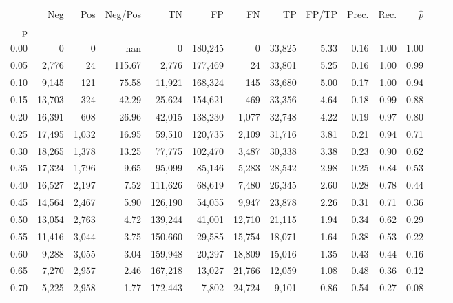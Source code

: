 \begin{tabular}{rrrrrrrrrrrrrr}
\toprule
{} &     Neg &    Pos & Neg/Pos &       TN &       FP &      FN &      TP & FP/TP & Prec. &  Rec. & $\hat{p}$ \\
p    &         &        &         &          &          &         &         &       &       &       &           \\
\midrule
0.00 &       0 &      0 &     nan &        0 &  180,245 &       0 &  33,825 &  5.33 &  0.16 &  1.00 &      1.00 \\
0.05 &   2,776 &     24 &  115.67 &    2,776 &  177,469 &      24 &  33,801 &  5.25 &  0.16 &  1.00 &      0.99 \\
0.10 &   9,145 &    121 &   75.58 &   11,921 &  168,324 &     145 &  33,680 &  5.00 &  0.17 &  1.00 &      0.94 \\
0.15 &  13,703 &    324 &   42.29 &   25,624 &  154,621 &     469 &  33,356 &  4.64 &  0.18 &  0.99 &      0.88 \\
0.20 &  16,391 &    608 &   26.96 &   42,015 &  138,230 &   1,077 &  32,748 &  4.22 &  0.19 &  0.97 &      0.80 \\
0.25 &  17,495 &  1,032 &   16.95 &   59,510 &  120,735 &   2,109 &  31,716 &  3.81 &  0.21 &  0.94 &      0.71 \\
0.30 &  18,265 &  1,378 &   13.25 &   77,775 &  102,470 &   3,487 &  30,338 &  3.38 &  0.23 &  0.90 &      0.62 \\
0.35 &  17,324 &  1,796 &    9.65 &   95,099 &   85,146 &   5,283 &  28,542 &  2.98 &  0.25 &  0.84 &      0.53 \\
0.40 &  16,527 &  2,197 &    7.52 &  111,626 &   68,619 &   7,480 &  26,345 &  2.60 &  0.28 &  0.78 &      0.44 \\
0.45 &  14,564 &  2,467 &    5.90 &  126,190 &   54,055 &   9,947 &  23,878 &  2.26 &  0.31 &  0.71 &      0.36 \\
0.50 &  13,054 &  2,763 &    4.72 &  139,244 &   41,001 &  12,710 &  21,115 &  1.94 &  0.34 &  0.62 &      0.29 \\
0.55 &  11,416 &  3,044 &    3.75 &  150,660 &   29,585 &  15,754 &  18,071 &  1.64 &  0.38 &  0.53 &      0.22 \\
0.60 &   9,288 &  3,055 &    3.04 &  159,948 &   20,297 &  18,809 &  15,016 &  1.35 &  0.43 &  0.44 &      0.16 \\
0.65 &   7,270 &  2,957 &    2.46 &  167,218 &   13,027 &  21,766 &  12,059 &  1.08 &  0.48 &  0.36 &      0.12 \\
0.70 &   5,225 &  2,958 &    1.77 &  172,443 &    7,802 &  24,724 &   9,101 &  0.86 &  0.54 &  0.27 &      0.08 \\

\end{tabular}
